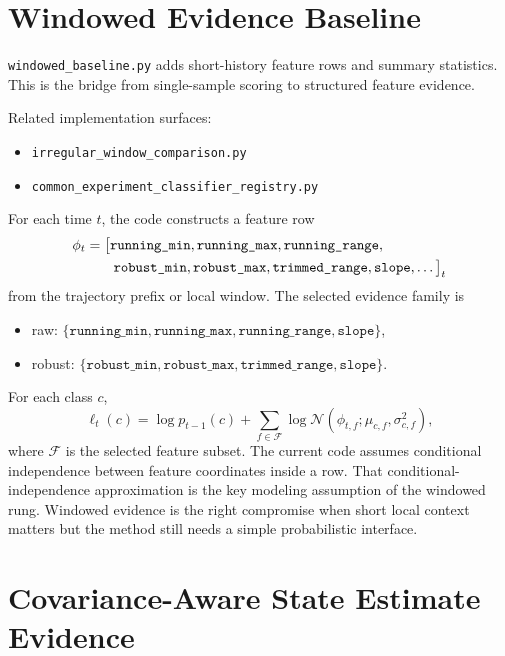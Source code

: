 \documentclass[11pt]{article}
\begin{document}
\section{Windowed Evidence Baseline}

\texttt{windowed\_baseline.py} adds short-history feature rows and summary
statistics. This is the bridge from single-sample scoring to structured feature
evidence.

Related implementation surfaces:
\begin{itemize}[leftmargin=1.5em]
    \item \texttt{irregular\_window\_comparison.py}
    \item \texttt{common\_experiment\_classifier\_registry.py}
\end{itemize}

For each time \(t\), the code constructs a feature row
\begin{align}
    \phi_t
    &=
    \big[
        \texttt{running\_min},
        \texttt{running\_max},
        \texttt{running\_range},
        \notag \\
    &\qquad
        \texttt{robust\_min},
        \texttt{robust\_max},
        \texttt{trimmed\_range},
        \texttt{slope},
        \dots
    \big]_t
\end{align}
from the trajectory prefix or local window. The selected evidence family is
\begin{itemize}[leftmargin=1.5em]
    \item raw: \(\{\texttt{running\_min}, \texttt{running\_max}, \texttt{running\_range}, \texttt{slope}\}\),
    \item robust: \(\{\texttt{robust\_min}, \texttt{robust\_max}, \texttt{trimmed\_range}, \texttt{slope}\}\).
\end{itemize}
For each class \(c\),
\begin{equation}
    \ell_t(c)
    = \log p_{t-1}(c)
    + \sum_{f \in \mathcal{F}}
    \log \mathcal{N}\!\left(\phi_{t,f}; \mu_{c,f}, \sigma_{c,f}^2\right),
\end{equation}
where \(\mathcal{F}\) is the selected feature subset. The current code assumes
conditional independence between feature coordinates inside a row.
That conditional-independence approximation is the key modeling assumption of
the windowed rung.
Windowed evidence is the right compromise when short local context matters but
the method still needs a simple probabilistic interface.

\section{Covariance-Aware State Estimate Evidence}
\end{document}
